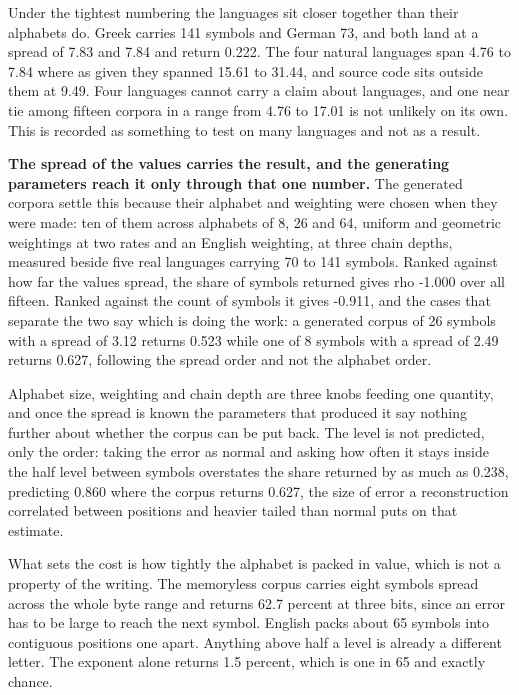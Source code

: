 Under the tightest numbering the languages sit closer together than their alphabets do. Greek carries 141 symbols and German 73, and both land at a spread of 7.83 and 7.84 and return 0.222. The four natural languages span 4.76 to 7.84 where as given they spanned 15.61 to 31.44, and source code sits outside them at 9.49. Four languages cannot carry a claim about languages, and one near tie among fifteen corpora in a range from 4.76 to 17.01 is not unlikely on its own. This is recorded as something to test on many languages and not as a result.

\textbf{The spread of the values carries the result, and the generating parameters reach it only through that one number.} The generated corpora settle this because their alphabet and weighting were chosen when they were made: ten of them across alphabets of 8, 26 and 64, uniform and geometric weightings at two rates and an English weighting, at three chain depths, measured beside five real languages carrying 70 to 141 symbols. Ranked against how far the values spread, the share of symbols returned gives rho -1.000 over all fifteen. Ranked against the count of symbols it gives -0.911, and the cases that separate the two say which is doing the work: a generated corpus of 26 symbols with a spread of 3.12 returns 0.523 while one of 8 symbols with a spread of 2.49 returns 0.627, following the spread order and not the alphabet order.

Alphabet size, weighting and chain depth are three knobs feeding one quantity, and once the spread is known the parameters that produced it say nothing further about whether the corpus can be put back. The level is not predicted, only the order: taking the error as normal and asking how often it stays inside the half level between symbols overstates the share returned by as much as 0.238, predicting 0.860 where the corpus returns 0.627, the size of error a reconstruction correlated between positions and heavier tailed than normal puts on that estimate.

What sets the cost is how tightly the alphabet is packed in value, which is not a property of the writing. The memoryless corpus carries eight symbols spread across the whole byte range and returns 62.7 percent at three bits, since an error has to be large to reach the next symbol. English packs about 65 symbols into contiguous positions one apart. Anything above half a level is already a different letter. The exponent alone returns 1.5 percent, which is one in 65 and exactly chance.

